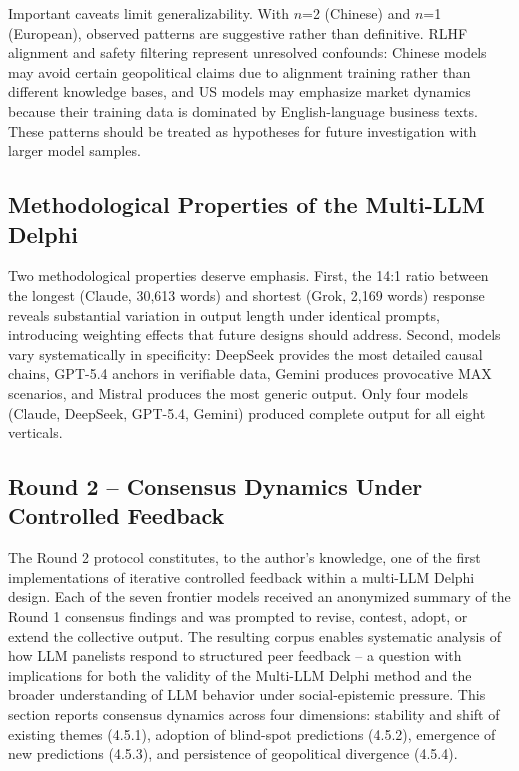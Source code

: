 \documentclass[preprint,review,12pt]{elsarticle}
\begin{document}
Important caveats limit generalizability. With $n$=2 (Chinese) and $n$=1 (European), observed patterns are suggestive rather than definitive. RLHF alignment and safety filtering represent unresolved confounds: Chinese models may avoid certain geopolitical claims due to alignment training rather than different knowledge bases, and US models may emphasize market dynamics because their training data is dominated by English-language business texts. These patterns should be treated as hypotheses for future investigation with larger model samples.


\subsection{Methodological Properties of the Multi-LLM Delphi}
\label{sec:methodological_properties}

Two methodological properties deserve emphasis. First, the 14:1 ratio between the longest (Claude, 30,613 words) and shortest (Grok, 2,169 words) response reveals substantial variation in output length under identical prompts, introducing weighting effects that future designs should address. Second, models vary systematically in specificity: DeepSeek provides the most detailed causal chains, GPT-5.4 anchors in verifiable data, Gemini produces provocative MAX scenarios, and Mistral produces the most generic output. Only four models (Claude, DeepSeek, GPT-5.4, Gemini) produced complete output for all eight verticals.


\subsection{Round 2 -- Consensus Dynamics Under Controlled Feedback}
\label{sec:round2_results}

The Round 2 protocol constitutes, to the author's knowledge, one of the first implementations of iterative controlled feedback within a multi-LLM Delphi design. Each of the seven frontier models received an anonymized summary of the Round 1 consensus findings and was prompted to revise, contest, adopt, or extend the collective output. The resulting corpus enables systematic analysis of how LLM panelists respond to structured peer feedback -- a question with implications for both the validity of the Multi-LLM Delphi method and the broader understanding of LLM behavior under social-epistemic pressure. This section reports consensus dynamics across four dimensions: stability and shift of existing themes (4.5.1), adoption of blind-spot predictions (4.5.2), emergence of new predictions (4.5.3), and persistence of geopolitical divergence (4.5.4).
\end{document}
